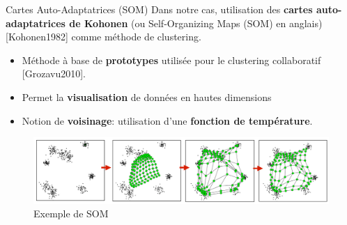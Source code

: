 \documentclass[hyperref={pdfpagelabels=false}]{beamer}
\begin{document}
        \begin{frame}{Cartes Auto-Adaptatrices (SOM)}
            Dans notre cas, utilisation des \textbf{cartes auto-adaptatrices de
            Kohonen} (ou Self-Organizing Maps (SOM) en anglais) [Kohonen1982]
            comme méthode de clustering.
            \begin{itemize}
                \item Méthode à base de \textbf{prototypes} utilisée pour le
                    clustering collaboratif [Grozavu2010].
                \item Permet la \textbf{visualisation} de données en hautes 
                    dimensions
                \item Notion de \textbf{voisinage}: utilisation d'une 
                    \textbf{fonction de température}.
            \end{itemize}

            \begin{figure}[b]
                \centering
                \includegraphics[scale=.43]{SOM2}
                \caption{Exemple de SOM}
            \end{figure}
        \end{frame}
\end{document}
